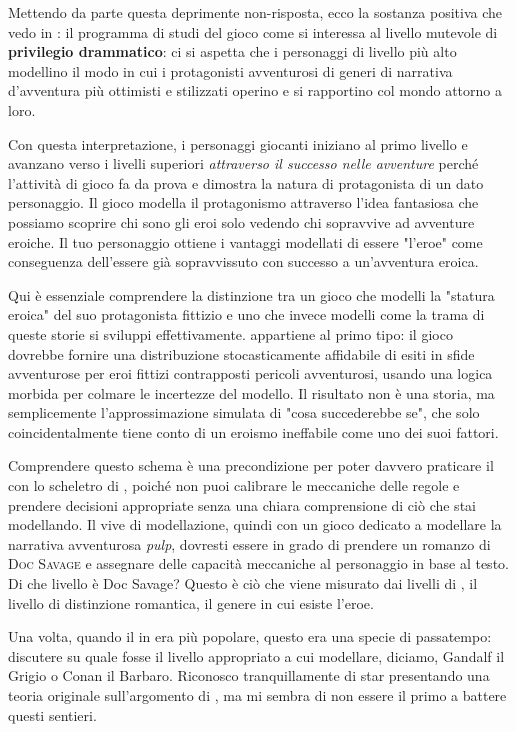 
Mettendo da parte questa deprimente non-risposta, ecco la sostanza positiva che vedo in \dnd{}: il programma di studi del gioco come  si interessa al livello mutevole di \textbf{privilegio drammatico}: ci si aspetta che i personaggi di livello più alto modellino il modo in cui i protagonisti avventurosi di generi di narrativa d'avventura più ottimisti e stilizzati operino e si rapportino col mondo attorno a loro.

Con questa interpretazione, i personaggi giocanti iniziano al primo livello e avanzano verso i livelli superiori \textit{attraverso il successo nelle avventure} perché l'attività di gioco fa da prova e dimostra la natura di protagonista di un dato personaggio. Il gioco modella il protagonismo attraverso l'idea fantasiosa che possiamo scoprire chi sono gli eroi solo vedendo chi sopravvive ad avventure eroiche. Il tuo personaggio ottiene i vantaggi modellati di essere "l'eroe" come conseguenza dell'essere già sopravvissuto con successo a un'avventura eroica.

Qui è essenziale comprendere la distinzione tra un gioco che modelli la "statura eroica" del suo protagonista fittizio e uno che invece modelli come la trama di queste storie si sviluppi effettivamente. \dnd{} appartiene al primo tipo: il gioco dovrebbe fornire una distribuzione stocasticamente affidabile di esiti in sfide avventurose per eroi fittizi contrapposti pericoli avventurosi, usando una logica morbida per colmare le incertezze del modello. Il risultato non è una storia, ma semplicemente l'approssimazione simulata di "cosa succederebbe se", che solo coincidentalmente tiene conto di un eroismo ineffabile come uno dei suoi fattori.

Comprendere questo schema è una precondizione per poter davvero praticare il  con lo scheletro di \dnd{}, poiché non puoi calibrare le meccaniche delle regole e prendere decisioni appropriate senza una chiara comprensione di ciò che stai modellando. Il  vive di modellazione, quindi con un gioco dedicato a modellare la narrativa avventurosa \textit{pulp}, dovresti essere in grado di prendere un romanzo di \textsc{Doc Savage} e assegnare delle capacità meccaniche al personaggio in base al testo. Di che livello è Doc Savage? Questo è ciò che viene misurato dai livelli di \dnd{}, il livello di distinzione romantica, il genere in cui esiste l'eroe.

Una volta, quando il  in \dnd{} era più popolare, questo era una specie di passatempo: discutere su quale fosse il livello appropriato a cui modellare, diciamo, Gandalf il Grigio o Conan il Barbaro. Riconosco tranquillamente di star presentando una teoria originale sull'argomento di \dnd{}, ma mi sembra di non essere il primo a battere questi sentieri.

